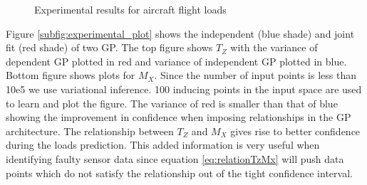 \begin{figure}[!t]
  \centering
  \quad
  
  \caption{Experimental results for aircraft flight loads}
\end{figure}

Figure \ref{subfig:experimental_plot} shows the independent (blue shade) and joint fit (red shade) of two GP. The top figure shows \(T_{Z}\) with the variance of dependent GP plotted in red and variance of independent GP plotted in blue. Bottom figure shows plots for \(M_{X}\). Since the number of input points is less than 10e5 we use variational inference. 100 inducing points in the input space are used to learn and plot the figure. The variance of red is smaller than that of blue showing the improvement in confidence when imposing relationships in the GP architecture. The relationship between \(T_{Z}\) and \(M_{X}\) gives rise to better confidence during the loads prediction. This added information is very useful when identifying faulty sensor data since equation \ref{eq:relationTzMx} will push data points which do not satisfy the relationship out of the tight confidence interval.

